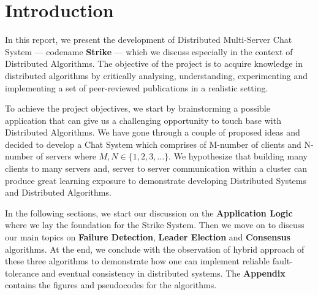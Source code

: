 \documentclass[dareport.tex]{subfiles}
\begin{document}

\section{Introduction}
In this report, we present the development of Distributed Multi-Server Chat System --- codename \textbf{Strike} --- which we discuss especially in the context of Distributed Algorithms. The objective of the project is to acquire knowledge in distributed algorithms by critically analysing, understanding, experimenting and implementing a set of peer-reviewed publications in a realistic setting.


To achieve the project objectives, we start by brainstorming a possible application that can give us a challenging opportunity to touch base with Distributed Algorithms. We have gone through a couple of proposed ideas and decided to develop a Chat System which comprises of M-number of clients and N-number of servers where $ M,N \in \{1, 2, 3,\dots\} $. We hypothesize that building many clients to many servers and, server to server communication within a cluster can produce great learning exposure to demonstrate developing Distributed Systems and Distributed Algorithms. 


In the following sections, we start our discussion on the \textbf{Application Logic} where we lay the foundation for the Strike System. Then we move on to discuss our main topics on \textbf{Failure Detection}, \textbf{Leader Election} and \textbf{Consensus} algorithms. At the end, we conclude with the observation of hybrid approach of these three algorithms to demonstrate how one can implement reliable fault-tolerance and eventual consistency in distributed systems. The \textbf{Appendix} contains the figures and pseudocodes for the algorithms.
\end{document}
